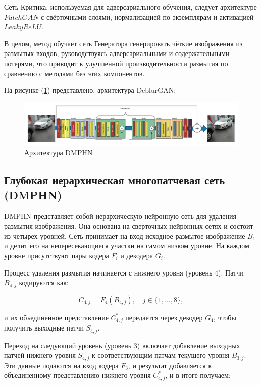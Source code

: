 Сеть Критика, используемая для адверсариального обучения, следует архитектуре \(PatchGAN\) с свёрточными слоями, нормализацией по экземплярам и активацией \(LeakyReLU\).

В целом, метод обучает сеть Генератора генерировать чёткие изображения из размытых входов, руководствуясь адверсариальными и содержательными потерями, что приводит к улучшенной производительности размытия по сравнению с методами без этих компонентов.

На рисунке (\ref{fig:deblur-gan}) представлено, архитектура DeblurGAN: 
\begin{figure}[H]
	\centering
	\includegraphics[width=1\linewidth]{assets/deblur-gan.png}
	\caption{Архитектура DMPHN}
	\label{fig:deblur-gan}
\end{figure}


\subsection{Глубокая иерархическая многопатчевая сеть (DMPHN)}

DMPHN представляет собой иерархическую нейронную сеть для удаления размытия изображения. Она основана на сверточных нейронных сетях и состоит из четырех уровней. Сеть принимает на вход исходное размытое изображение \(B_1\) и делит его на непересекающиеся участки на самом низком уровне. На каждом уровне присутствуют пары кодера \(F_i\) и декодера \(G_i\).

Процесс удаления размытия начинается с нижнего уровня (уровень 4). Патчи \(B_{4,j}\) кодируются как:

\begin{equation}
	C_{4,j} = F_{4}(B_{4,j}), \quad j \in \{1, \dots, 8\},
\end{equation}

и их объединенное представление \(C_{4,j}^{\ast}\) передается через декодер \(G_{4}\), чтобы получить выходные патчи \(S_{4,j}\).

Переход на следующий уровень (уровень 3) включает добавление выходных патчей нижнего уровня \(S_{4,j}\) к соответствующим патчам текущего уровня \(B_{3,j}\). Эти данные подаются на вход кодера \(F_{3}\), и результат добавляется к объединенному представлению нижнего уровня \(C_{4,j}^{\ast}\), и в итоге получаем:

